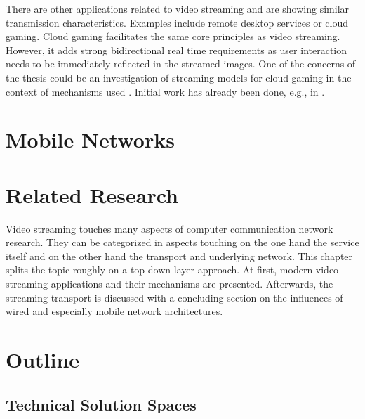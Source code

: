 There are other applications related to video streaming and are showing similar transmission characteristics. Examples include remote desktop services or cloud gaming. Cloud gaming facilitates the same core principles as video streaming. However, it adds strong bidirectional real time requirements as user interaction needs to be immediately reflected in the streamed images. One of the concerns of the thesis could be an investigation of streaming models for cloud gaming in the context of mechanisms used . Initial work has already been done, e.g., in \cite{4795441,wang2009modeling,jarschel2011cloudevaluation,ct2010wolken}.



\section{Mobile Networks}



\section{Related Research}

Video streaming touches many aspects of computer communication network research. They can be categorized in aspects touching on the one hand the service itself and on the other hand  the transport and underlying network. This chapter splits the topic roughly on a top-down layer approach. At first, modern video streaming applications and their mechanisms are presented. Afterwards, the streaming transport is discussed with a concluding section on the influences of wired and especially mobile network architectures.





\section{Outline}




\subsection{Technical Solution Spaces}


